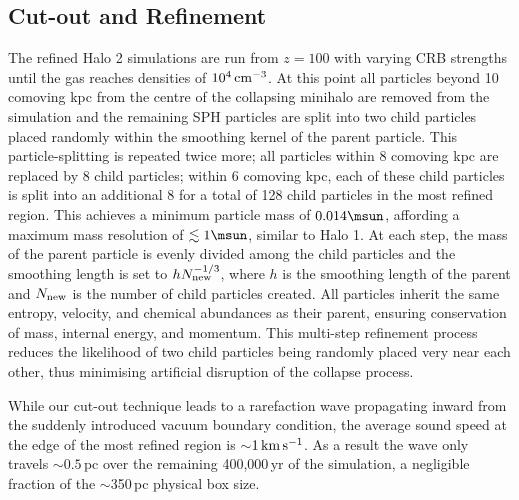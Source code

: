 \subsection{Cut-out and Refinement}
\label{cutout}

The refined Halo 2 simulations are run from $z=100$ with varying CRB strengths until the gas reaches densities of $10^4\,{\rm cm}^{-3}$.  At this point all particles beyond 10 comoving kpc from the centre of the collapsing minihalo are removed from the simulation and the remaining SPH particles are split into two child particles placed randomly within the smoothing kernel of the parent particle.  This particle-splitting is repeated twice more; all particles within 8 comoving kpc are replaced by 8 child particles; within 6 comoving kpc, each of these child particles is split into an additional 8 for a total of 128 child particles in the most refined region.  This achieves a minimum particle mass of $0.014\msun$, affording a maximum mass resolution of $\lesssim 1\msun$, similar to Halo 1.  At each step, the mass of the parent particle is evenly divided among the child particles and the smoothing length is set to $h N_{\rm new}^{-1/3}$, where $h$ is the smoothing length of the parent and $N_{\rm new}$ is the number of child particles created.  All particles inherit the same entropy, velocity, and chemical abundances as their parent, ensuring conservation of mass, internal energy, and momentum.  This multi-step refinement process reduces the likelihood of two child particles being randomly placed very near each other, thus minimising artificial disruption of the collapse process.

While our cut-out technique leads to a rarefaction wave propagating inward from the suddenly introduced vacuum boundary condition, the average sound speed at the edge of the most refined region is $\sim$$1\,{\rm km}\,{\rm s}^{-1}$.  As a result the wave only travels $\sim$$0.5\,$pc over the remaining 400,000$\,$yr of the simulation, a negligible fraction of the $\sim$350$\,$pc physical box size.